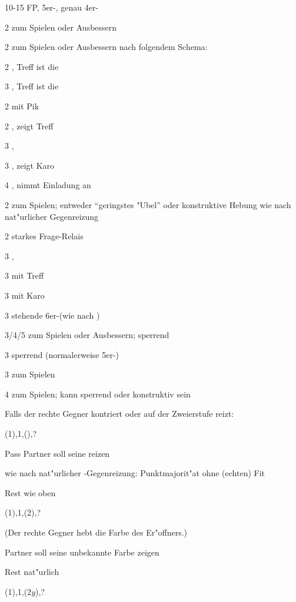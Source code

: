 \begin{appendix}
		10-15 FP, 5\pl{}er-\ufa, genau 4er-\pi
		\bdsc
			\item[2\tre] zum Spielen oder Ausbessern
			\item[2\kar] zum Spielen oder Ausbessern nach folgendem Schema:
				\bdsc
					\item[2\SA] \maxi, Treff ist die \ufa
					\item[3\tre] \mini, Treff ist die \ufa
				\edsc
			\item[2\coe] \inv{}\pl mit Pik
				\bdsc
					\item[2\SA] \maxi, zeigt Treff
					\item[3\uf] \mini, \nat
					\item[3\coe] \maxi, zeigt Karo
					\item[4\pik] \maxi, nimmt Einladung an
				\edsc
			\item[2\pik] zum Spielen; entweder "`geringstes "Ubel"' oder
				konstruktive Hebung wie nach nat"urlicher Gegenreizung
			\item[2\NT] starkes Frage-Relais
				\bdsc
					\item[3\uf] \mini, \nat
					\item[3\coe] \maxi mit Treff
					\item[3\pik] \maxi mit Karo
					\item[3\SA] stehende 6er-\ufa (wie nach )
				\edsc
			\item[3\uf/4\uf/5\tre] zum Spielen oder Ausbessern; sperrend
			\item[3\pik] sperrend (normalerweise 5er-\pi)
			\item[3\SA] zum Spielen
			\item[4\pik] zum Spielen; kann sperrend oder konstruktiv sein
		\edsc
\edsc

Falls der rechte Gegner kontriert oder auf der Zweierstufe reizt:
\bdsc
	\item[(1\anybid{})\sep{}1\SA{}\sep{}(\kontra{})\sep{}?]~
		\bdsc
			\item[Pass] Partner soll seine \ufa reizen
			\item[\rekontra] wie nach nat"urlicher \ofa-Gegenreizung: Punktmajorit"at
				ohne (echten) Fit
			\item[Rest] wie oben
		\edsc
	\item[(1\anybid{})\sep{}1\SA{}\sep{}(2\anybid{})\sep{}?]~
	
		(Der rechte Gegner hebt die Farbe des Er"offners.)
		\bdsc
			\item[\kontra] Partner soll seine unbekannte Farbe zeigen
			\item[Rest] nat"urlich
		\edsc
	\item[(1\anybid{})\sep{}1\SA{}\sep{}(2\hspace{\cardskip}$y$)\sep{}?]~
	

\end{appendix}
